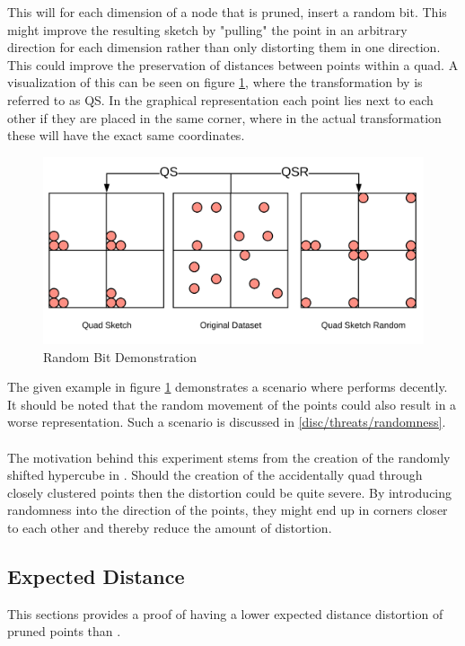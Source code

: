 This will for each dimension of a node that is pruned, insert a random bit. This might improve the resulting sketch by "pulling" the point in an arbitrary direction for each dimension rather than only distorting them in one direction. This could improve the preservation of distances between points within a quad. A visualization of this can be seen on figure \ref{fig:randombits}, where the transformation by \qs{} is referred to as QS. In the graphical representation each point lies next to each other if they are placed in the same corner, where in the actual transformation these will have the exact same coordinates. 
\begin{figure}[h]
	\includegraphics[width=1\textwidth]{figures/randombits}
	\caption{Random Bit Demonstration}
	\label{fig:randombits}
\end{figure}
The given example in figure \ref{fig:randombits} demonstrates a scenario where \qsr{} performs decently. It should be noted that the random movement of the points could also result in a worse representation. Such a scenario is discussed in \ref{disc/threats/randomness}.
\\
\\
The motivation behind this experiment stems from the creation of the randomly shifted hypercube in \qs{}. Should the creation of the \qt{} accidentally quad through closely clustered points then the distortion could be quite severe. By introducing randomness into the direction of the points, they might end up in corners closer to each other and thereby reduce the amount of distortion.

\subsection{Expected Distance}
\label{exp:dist}
This sections provides a proof of \qsr{} having a lower expected distance distortion of pruned points than \qs{}. 

